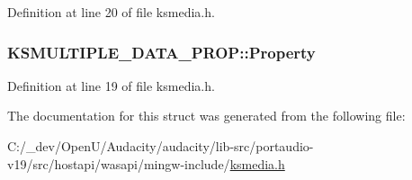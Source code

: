 Definition at line 20 of file ksmedia.\+h.

\subsubsection[{\texorpdfstring{Property}{Property}}]{ K\+S\+M\+U\+L\+T\+I\+P\+L\+E\+\_\+\+D\+A\+T\+A\+\_\+\+P\+R\+O\+P\+::\+Property}\hypertarget{struct_k_s_m_u_l_t_i_p_l_e___d_a_t_a___p_r_o_p_aea1743526fa697c77ca6477f7f2aa7fb}{}\label{struct_k_s_m_u_l_t_i_p_l_e___d_a_t_a___p_r_o_p_aea1743526fa697c77ca6477f7f2aa7fb}


Definition at line 19 of file ksmedia.\+h.



The documentation for this struct was generated from the following file\+:\begin{DoxyCompactItemize}
\item 
C\+:/\+\_\+dev/\+Open\+U/\+Audacity/audacity/lib-\/src/portaudio-\/v19/src/hostapi/wasapi/mingw-\/include/\hyperlink{ksmedia_8h}{ksmedia.\+h}\end{DoxyCompactItemize}
